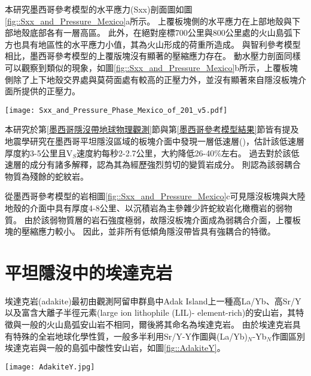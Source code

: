 本研究墨西哥參考模型的水平應力(Sxx)剖面圖如圖\ref{fig::Sxx_and_Pressure_Mexico}a所示。
上覆板塊側的水平應力在上部地殼與下部地殼底部各有一層高區。
此外，在絕對座標700公里與800公里處的火山島弧下方也具有地區性的水平應力小值，其為火山形成的荷重所造成。
與智利參考模型相比，墨西哥參考模型的上覆版塊沒有顯著的壓縮應力存在。
動水壓力剖面同樣可以觀察到類似的現象，如圖\ref{fig::Sxx_and_Pressure_Mexico}b所示，上覆板塊側除了上下地殼交界處與莫荷面處有較高的正壓力外，並沒有顯著來自隱沒板塊介面所提供的正壓力。
\begin{figure*}[ht!]
    \centering
    \texttt{[image: Sxx\_and\_Pressure\_Phase\_Mexico\_of\_201\_v5.pdf]}
    \caption[墨西哥參考模型中於40 Myr的剖面]{墨西哥參考模型中於40 Myr的水平軸差應力、動水壓力與岩相剖面。(a)水平軸差應力剖面，其中應力正向代表拉張應力，負向代表壓縮應力。(b)動水壓力剖面。(c)模型岩相剖面，岩相顏色請見圖\ref{fig::Ref Cocos 26}。}
    \label{fig::Sxx_and_Pressure_Mexico}
\end{figure*}

本研究於第\ref{墨西哥隱沒帶地球物理觀測}節與第\ref{墨西哥參考模型結果}節皆有提及地震學研究在墨西哥平坦隱沒區域的板塊介面中發現一層低速層(\citealp{PerezCampos2008})，\citealp{Song2009}估計該低速層厚度約3-5公里且V$_S$速度約每秒2-2.7公里，大約降低26-40$\%$左右。
過去對於該低速層的成分有諸多解釋，\citealp{Song2012SC}認為其為經歷強烈剪切的變質岩成分。
\citealp{Manea2017}則認為該弱耦合物質為殘餘的蛇紋岩。

從墨西哥參考模型的岩相圖\ref{fig::Sxx_and_Pressure_Mexico}c可見隱沒板塊與大陸地殼的介面中具有厚度4-8公里、以沉積岩為主參雜少許蛇紋岩化橄欖岩的弱物質。
由於該弱物質層的岩石強度極弱，故隱沒板塊介面成為弱耦合介面，上覆板塊的壓縮應力較小。
因此，並非所有低傾角隱沒帶皆具有強耦合的特徵。

\section{平坦隱沒中的埃達克岩}\label{平坦隱沒中的埃達克岩}
埃達克岩(adakite)最初由\citealp{kay1978aleutian}觀測阿留申群島中Adak Island上一種高La/Yb、高Sr/Y以及富含大離子半徑元素(large ion lithophile (LIL)- element-rich)的安山岩，其特徵與一般的火山島弧安山岩不相同，爾後\citealp{defant1990derivation}將其命名為埃達克岩。
由於埃達克岩具有特殊的全岩地球化學性質，一般多半利用Sr/Y-Y作圖與(La/Yb)$_N$-Yb$_N$作圖區別埃達克岩與一般的島弧中酸性安山岩，如圖\ref{fig::AdakiteY}。

\begin{figure*}[h]
    \centering
    \texttt{[image: AdakiteY.jpg]}
    \caption[Sr/Y-Y作圖與(La/Yb)$_N$-Yb$_N$作圖]{(A)Sr/Y-Y作圖與(B)(La/Yb)$_N$-Yb$_N$作圖，摘自\citealp{castillo2012adakite}。通常用於區分埃達克岩與普通島弧安山岩、石英岩與流紋岩(normal arc andesite, dacite and rhyolite, ADR)。紫色實線邊界來自於\citealp{richards2007special}所提出菲律賓中南部埃達克岩與普通島弧安山岩的資料。}
    \label{fig::AdakiteY}
\end{figure*}

